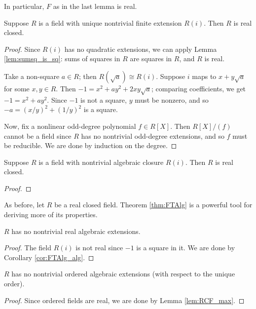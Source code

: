 In particular, $F$ as in the last lemma is real.

\begin{lemma}
  \label{lem:FTAlg_converse}
  Suppose $R$ is a field with unique nontrivial finite extension $R(i)$. Then $R$ is real closed.
\end{lemma}
\begin{proof}
  Since $R(i)$ has no quadratic extensions, we can apply Lemma \ref{lem:sumsq_is_sq}: sums of squares in $R$ are squares in $R$, and $R$ is real.

  Take a non-square $a\in R$; then $R(\sqrt{a})\cong R(i)$. Suppose $i$ maps to $x+y\sqrt{a}$ for some $x,y\in R$. Then $-1=x^2+ay^2+2xy\sqrt{a}$; comparing coefficients, we get $-1=x^2+ay^2$. Since $-1$ is not a square, $y$ must be nonzero, and so $-a=(x/y)^2+(1/y)^2$ is a square.

  Now, fix a nonlinear odd-degree polynomial $f\in R[X]$. Then $R[X]/(f)$ cannot be a field since $R$ has no nontrivial odd-degree extensions, and so $f$ must be reducible. We are done by induction on the degree.
\end{proof}

\begin{corollary}
  \label{lem:FTAlg_converse_alg_closure}
  Suppose $R$ is a field with nontrivial algebraic closure $R(i)$. Then $R$ is real closed.
\end{corollary}
\begin{proof}
\end{proof}

As before, let $R$ be a real closed field. Theorem \ref{thm:FTAlg} is a powerful tool for deriving more of its properties.

\begin{lemma}
  \label{lem:RCF_max}
  $R$ has no nontrivial real algebraic extensions.
\end{lemma}
\begin{proof}
  The field $R(i)$ is not real since $-1$ is a square in it. We are done by Corollary \ref{cor:FTAlg_alg}.
\end{proof}

\begin{corollary}
  \label{lem:RCF_max_ord}
  $R$ has no nontrivial ordered algebraic extensions (with respect to the unique order).
\end{corollary}
\begin{proof}
  Since ordered fields are real, we are done by Lemma \ref{lem:RCF_max}.
\end{proof}

